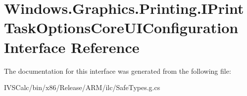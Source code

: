 \hypertarget{interface_windows_1_1_graphics_1_1_printing_1_1_i_print_task_options_core_u_i_configuration}{}\section{Windows.\+Graphics.\+Printing.\+I\+Print\+Task\+Options\+Core\+U\+I\+Configuration Interface Reference}
\label{interface_windows_1_1_graphics_1_1_printing_1_1_i_print_task_options_core_u_i_configuration}


The documentation for this interface was generated from the following file\+:\begin{DoxyCompactItemize}
\item 
I\+V\+S\+Calc/bin/x86/\+Release/\+A\+R\+M/ilc/Safe\+Types.\+g.\+cs\end{DoxyCompactItemize}
